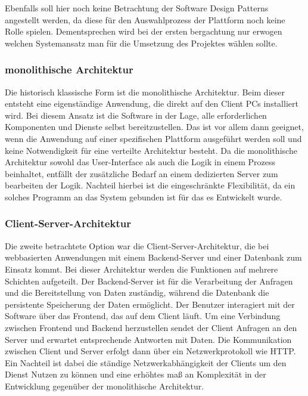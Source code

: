 Ebenfalls soll hier noch keine Betrachtung der Software Design Patterns angestellt werden, da diese für den Auswahlprozess der Plattform noch keine Rolle spielen. Dementsprechen wird bei der ersten bergachtung nur erwogen welchen Systemansatz man für die Umsetzung des Projektes wählen sollte.

\subsubsection{monolithische Architektur}
\label{sec:monolithisch}
Die historisch klassische Form ist die monolithische Architektur. Beim dieser entsteht eine eigenständige Anwendung, die \zB direkt auf den Client PCs installiert wird. Bei diesem Ansatz ist die Software in der Lage, alle erforderlichen Komponenten und Dienste selbst bereitzustellen. Das ist vor allem dann geeignet, wenn die Anwendung auf einer spezifischen Plattform ausgeführt werden soll und keine Notwendigkeit für eine verteilte Architektur besteht. Da die monolithische Architektur sowohl das User-Interface als auch die Logik in einem Prozess beinhaltet, entfällt der zusätzliche Bedarf an einem dedizierten Server zum bearbeiten der Logik. Nachteil hierbei ist die eingeschränkte Flexibilität, da ein solches Programm an das System gebunden ist für das es Entwickelt wurde.

\subsubsection{Client-Server-Architektur}
\label{sec:ClientServer}
Die zweite betrachtete Option war die Client-Server-Architektur, die bei webbasierten Anwendungen mit einem Backend-Server und einer Datenbank zum Einsatz kommt. Bei dieser Architektur werden die Funktionen auf mehrere Schichten aufgeteilt. Der Backend-Server ist für die Verarbeitung der Anfragen und die Bereitstellung von Daten zuständig, während die Datenbank die persistente Speicherung der Daten ermöglicht. Der Benutzer interagiert mit der Software über das Frontend, das auf dem Client läuft. Um eine Verbindung zwischen Frontend und Backend herzustellen sendet der Client Anfragen an den Server und erwartet entsprechende Antworten mit Daten. Die Kommunikation zwischen Client und Server erfolgt dann über ein Netzwerkprotokoll wie HTTP. Ein Nachteil ist dabei die ständige Netzwerkabhängigkeit der Clients um den Dienst Nutzen zu können und eine erhöhtes maß an Komplexität in der Entwicklung gegenüber der monolithische Architektur.

